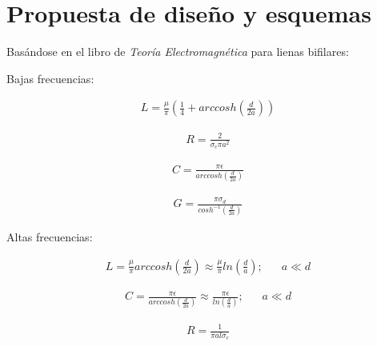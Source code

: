 \section{Propuesta de diseño y esquemas}

Basándose en el libro de \textit{Teoría Electromagnética} para lienas bifilares:

Bajas frecuencias:

\begin{align}
    L = \frac{\mu}{\pi}\left( \frac{1}{4} + arccosh \left( \frac{d}{2a} \right) \right)
\end{align}

\begin{align}
    R = \frac{2}{\sigma_c \pi a^2}
\end{align}

\begin{align}
    C = \frac{\pi \epsilon}{  arccosh \left( \frac{d}{2a} \right) }
\end{align}

\begin{align}
    G = \frac{\pi \sigma_d}{cosh^{-1} \left( \frac{d}{2a} \right)}
\end{align}

Altas frecuencias:

\begin{equation} \label{eq:L}
        \begin{aligned}
        L =    \frac{\mu}{\pi}    arccosh \left( \frac{d}{2a} \right) \approx \frac{\mu }{ \pi } ln \left( \frac{d}{a} \right) \text{;} &\quad    a \ll d
        \end{aligned}
        \end{equation}

\begin{equation} \label{eq:C}
        \begin{aligned}
        C =  \frac{  \pi \epsilon  }{   arccosh \left( \frac{d}{2a} \right) } \approx \frac{\pi \epsilon}{ ln( \frac{d}{a} ) }    \text{;} &\quad    a \ll d
        \end{aligned}
        \end{equation}

\begin{align} \label{eq:R}
    R = \frac{1}{\pi a l \sigma_c}
\end{align}

\begin{comment}
\begin{align}
    Z_o = \sqrt{\frac{L}{C}} = \frac{1}{\pi} \sqrt{\frac{\mu}{\epsilon}} arccosh \left( \frac{d}{2a} \right) 
\end{align}
\end{comment}

